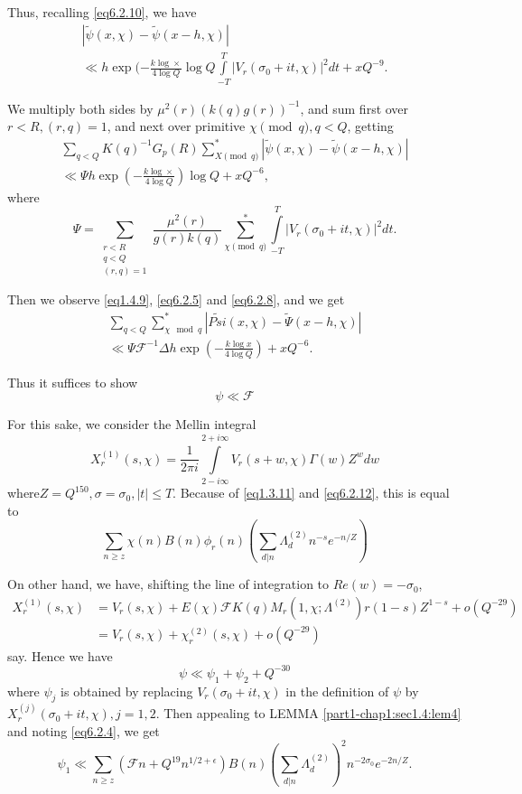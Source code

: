 Thus, recalling \eqref{eq6.2.10}, we have
\begin{gather*}
  | \tilde{\psi} (x, \chi) - \tilde{\psi}(x-h, \chi)|\\
  \ll h \exp (- \frac{k \log \times }{ 4 \log Q} \log Q
  \int\limits^T_{-T} | V_r (\sigma_0 + it, \chi)|^2 dt + xQ^{-9}. 
\end{gather*}\pageoriginale

We multiply both sides by $\mu^2 (r)(k(q) g (r))^{-1}$, and sum first
over $r < R, (r, q)=1$, and next over primitive $\chi \pmod{q}, q < Q$,
getting 
\begin{gather*}
  \sum_{q < Q} K(q)^{-1} G_p (R) \sum^{*}_{X \pmod{q}} |
  \tilde{\psi}(x, \chi)- \tilde{\psi}(x-h, \chi) |\\ 
  \ll \Psi h \exp \left(-\frac{k \log \times}{4 \log Q}\right)\log Q +
  xQ^{-6}, 
 \end{gather*} 
  where 
 $$
\Psi = \sum_{\substack{r < R\\q<Q\\(r, q)=1}} \frac{\mu^2(r)}{g (r)k 
  (q)} \sum^*_{\chi \pmod{q}} \int\limits^T_{-T} | V_r (\sigma_0 + it,
\chi)| ^2 dt. 
 $$
 
 Then we observe \eqref{eq1.4.9}, \eqref{eq6.2.5} and \eqref{eq6.2.8},
 and we get  
\begin{gather*}
  \sum_{ q < Q} \sum^*_{\chi \mod{q}} | \tilde{Psi}(x, \chi)-
  \tilde{\Psi}(x - h,  \chi)|\\ 
  \ll \Psi \mathscr{F}^{-1} \Delta h \exp \left(-\frac{k \log x}{4
    \log Q}\right) 
  + xQ ^{-6}. \tag{6.2.16}\label{eq6.2.16}
\end{gather*}

Thus it suffices to show
\begin{equation*}
  \psi \ll \mathscr{F} \tag{6.2.17}\label{eq6.2.17}
\end{equation*}

For this sake, we consider the Mellin integral
$$
X^{(1)}_{r} (s, \chi) = \frac{1}{2\pi i} \int\limits^{2 + i \infty}_{ 2
  - i \infty} V_r (s+w, \chi) \Gamma (w) Z^w dw 
$$
where\pageoriginale $Z=Q^{150}, \sigma = \sigma_0, |t|\le T$. Because
of \eqref{eq1.3.11} 
and \eqref{eq6.2.12}, this is equal to  
$$
\sum_{n \ge z} \chi (n) B (n)\phi_r (n) \left(\sum_{d | n}
\Lambda_d^{(2)} n^{-s} e^{-n/Z}\right) 
$$

On other hand, we have, shifting the line of integration to $Re(w)=-
\sigma_0$,  
\begin{align*}
  X^{(1)}_{r} (s, \chi) &= V_r (s, \chi) + E (\chi) \mathscr{F} K (q)
  M_r (1, \chi;  \Lambda^{(2)}) r (1-s) Z^{1-s} + o (Q^{-29})\\ 
  &= V_r (s, \chi) + \chi^{(2)}_{r} (s, \chi) + o(Q^{-29}) 
\end{align*}
say. Hence we have 
$$
\psi \ll \psi_1 + \psi_2 + Q^{-30}
$$
where $\psi_j$ is obtained by replacing $V_r(\sigma_0 + it, \chi)$ in
the definition of $\psi$ by $X^{(j)}_{r} (\sigma_0 + it, \chi ),
j=1,2$. Then appealing to LEMMA \ref{part1-chap1:sec1.4:lem4} and
noting \eqref{eq6.2.4}, we get  
$$
\psi_1 \ll \sum_{n \ge z} (\mathscr{F} n + Q^{19} n^{1/2 +
  \epsilon }) B (n) \left(\sum_{d|n}  \Lambda_d^{(2)}\right)^2
n^{-2 \sigma _0} e^{-2n/Z}. 
$$

